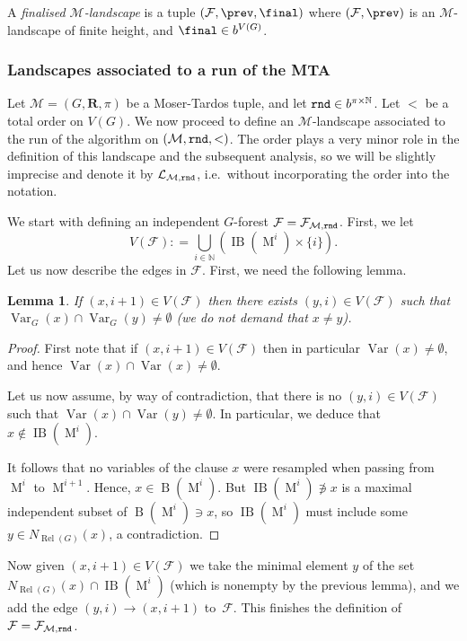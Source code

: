 \documentclass[12pt,a4paper]{article}
\numberwithin{equation}{section}
\newtheorem{lemma}[equation]{Lemma}
\theoremstyle{definition}
\newcommand\NN{\mathbb N}
\renewcommand{\cal}[1]{{\mathcal #1}}
\newcommand\MT{\operatorname{M}}
\newcommand\B{\operatorname{B}}
\newcommand\IB{\operatorname{IB}}
\newcommand\Rel{\operatorname{Rel}}
\newcommand\Var{\operatorname{Var}}
\begin{document}
    A \emph{finalised $\cal M$-landscape} is a tuple $(\cal F,\prev, \final)$ where $(\cal F, \prev)$ is an $\cal M$-landscape of finite height, and $\final\in b^{V(G)}$.
    
    \subsubsection{Landscapes associated to a run of the MTA}
    
    Let  $\cal M = (G, \mathbf R,  \pi)$ be a Moser-Tardos tuple, and let $\rnd\in b^{\pi\times \NN}$. Let $<$ be a total order on $V(G)$. We now proceed to define an  $\cal M$-landscape associated to the run of the algorithm on $(\cal M,\rnd, <)$. The order plays a very minor role in the definition of this landscape and the subsequent analysis, so we will be slightly imprecise and denote it by $\cal L_{\cal M,\rnd}$, i.e.~without incorporating the order into the notation.
    
    We start with defining an independent $G$-forest $\cal F = \cal F_{\cal M,\rnd}$. First, we let 
    $$
        V(\cal F): = \bigcup_{i\in \NN} \left(\IB(\MT^i)\times\{i\}\right).
    $$
    Let us now describe the edges in $\cal F$. First, we need the following lemma.
    \begin{lemma}\label{lem-13} If  $(x,i+1)\in V(\cal F)$ then   
    there exists $(y,i)\in V(\cal F)$ such that $\Var_G(x)\cap \Var_G(y)\neq \emptyset$ (we do not demand that $x\neq y$). 
    \end{lemma}
    \begin{proof}
    First note that if $(x,i+1)\in V(\cal F)$ then in particular $\Var(x)\neq \emptyset$, and hence $\Var(x)\cap \Var(x) \neq \emptyset$.
    
    Let us now assume, by way of contradiction, that there is no $(y,i)\in V(\cal F)$ such that $\Var(x)\cap \Var(y) \neq \emptyset$. In particular, we deduce that $x\notin \IB(\MT^i)$.
    
    It follows that no variables of the clause $x$ were resampled when passing from $\MT^i$ to $\MT^{i+1}$. Hence, $x\in \B(\MT^i)$. But $\IB(\MT^i)\not\ni x$ is a maximal independent subset of $\B(\MT^i)\ni x$, so $\IB(\MT^i)$ must include some $y\in N_{\Rel(G)}(x)$, a contradiction.
    \end{proof}
    
    Now given $(x,i+1)\in V(\cal F)$ we take the minimal element $y$ of 
    the set $N_{\Rel(G)}(x)\cap \IB(\MT^i)$ (which is nonempty by the previous lemma), and we add the edge $(y,i)\to 
    (x,i+1)$ to~$\cal F$. This finishes the definition of $\cal F = \cal 
    F_{\cal M,\rnd}$.
    
\end{document}
